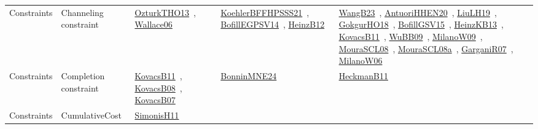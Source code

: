 {\begin{longtable}{lp{3cm}>{\raggedright\arraybackslash}p{6cm}>{\raggedright\arraybackslash}p{6cm}>{\raggedright\arraybackslash}p{8cm}}
Constraints & Channeling constraint & \href{../works/OzturkTHO13.pdf}{OzturkTHO13}~\cite{OzturkTHO13}, \href{../works/Wallace06.pdf}{Wallace06}~\cite{Wallace06} & \href{../works/KoehlerBFFHPSSS21.pdf}{KoehlerBFFHPSSS21}~\cite{KoehlerBFFHPSSS21}, \href{../works/BofillEGPSV14.pdf}{BofillEGPSV14}~\cite{BofillEGPSV14}, \href{../works/HeinzB12.pdf}{HeinzB12}~\cite{HeinzB12} & \href{../works/WangB23.pdf}{WangB23}~\cite{WangB23}, \href{../works/AntuoriHHEN20.pdf}{AntuoriHHEN20}~\cite{AntuoriHHEN20}, \href{../works/LiuLH19.pdf}{LiuLH19}~\cite{LiuLH19}, \href{../works/GokgurHO18.pdf}{GokgurHO18}~\cite{GokgurHO18}, \href{../works/BofillGSV15.pdf}{BofillGSV15}~\cite{BofillGSV15}, \href{../works/HeinzKB13.pdf}{HeinzKB13}~\cite{HeinzKB13}, \href{../works/KovacsB11.pdf}{KovacsB11}~\cite{KovacsB11}, \href{../works/WuBB09.pdf}{WuBB09}~\cite{WuBB09}, \href{../works/MilanoW09.pdf}{MilanoW09}~\cite{MilanoW09}, \href{../works/MouraSCL08.pdf}{MouraSCL08}~\cite{MouraSCL08}, \href{../works/MouraSCL08a.pdf}{MouraSCL08a}~\cite{MouraSCL08a}, \href{../works/GarganiR07.pdf}{GarganiR07}~\cite{GarganiR07}, \href{../works/MilanoW06.pdf}{MilanoW06}~\cite{MilanoW06}\\
Constraints & Completion constraint & \href{../works/KovacsB11.pdf}{KovacsB11}~\cite{KovacsB11}, \href{../works/KovacsB08.pdf}{KovacsB08}~\cite{KovacsB08}, \href{../works/KovacsB07.pdf}{KovacsB07}~\cite{KovacsB07} & \href{../works/BonninMNE24.pdf}{BonninMNE24}~\cite{BonninMNE24} & \href{../works/HeckmanB11.pdf}{HeckmanB11}~\cite{HeckmanB11}\\
Constraints & CumulativeCost & \href{../works/SimonisH11.pdf}{SimonisH11}~\cite{SimonisH11} &  & \\

\end{longtable}}
